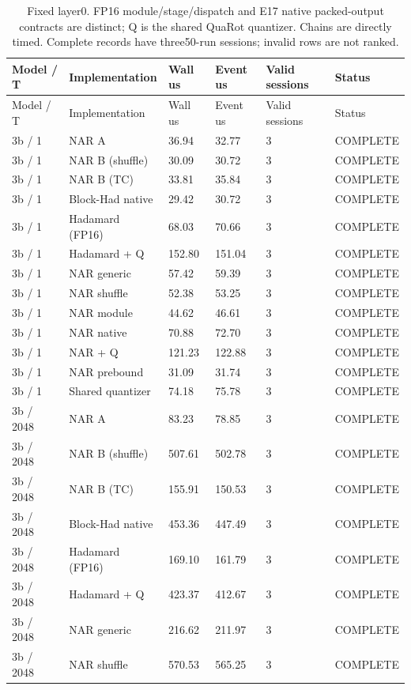 {\small
\begin{longtable}{llllll}
\caption{Fixed layer0. FP16 module/stage/dispatch and E17 native packed-output contracts are distinct; Q is the shared QuaRot quantizer. Chains are directly timed. Complete records have three50-run sessions; invalid rows are not ranked.} \\
\toprule
Model / T & Implementation & Wall us & Event us & Valid sessions & Status \\
\midrule
\endfirsthead
\toprule
Model / T & Implementation & Wall us & Event us & Valid sessions & Status \\
\midrule
\endhead
3b / 1 & NAR A & 36.94 & 32.77 & 3 & COMPLETE \\
3b / 1 & NAR B (shuffle) & 30.09 & 30.72 & 3 & COMPLETE \\
3b / 1 & NAR B (TC) & 33.81 & 35.84 & 3 & COMPLETE \\
3b / 1 & Block-Had native & 29.42 & 30.72 & 3 & COMPLETE \\
3b / 1 & Hadamard (FP16) & 68.03 & 70.66 & 3 & COMPLETE \\
3b / 1 & Hadamard + Q & 152.80 & 151.04 & 3 & COMPLETE \\
3b / 1 & NAR generic & 57.42 & 59.39 & 3 & COMPLETE \\
3b / 1 & NAR shuffle & 52.38 & 53.25 & 3 & COMPLETE \\
3b / 1 & NAR module & 44.62 & 46.61 & 3 & COMPLETE \\
3b / 1 & NAR native & 70.88 & 72.70 & 3 & COMPLETE \\
3b / 1 & NAR + Q & 121.23 & 122.88 & 3 & COMPLETE \\
3b / 1 & NAR prebound & 31.09 & 31.74 & 3 & COMPLETE \\
3b / 1 & Shared quantizer & 74.18 & 75.78 & 3 & COMPLETE \\
3b / 2048 & NAR A & 83.23 & 78.85 & 3 & COMPLETE \\
3b / 2048 & NAR B (shuffle) & 507.61 & 502.78 & 3 & COMPLETE \\
3b / 2048 & NAR B (TC) & 155.91 & 150.53 & 3 & COMPLETE \\
3b / 2048 & Block-Had native & 453.36 & 447.49 & 3 & COMPLETE \\
3b / 2048 & Hadamard (FP16) & 169.10 & 161.79 & 3 & COMPLETE \\
3b / 2048 & Hadamard + Q & 423.37 & 412.67 & 3 & COMPLETE \\
3b / 2048 & NAR generic & 216.62 & 211.97 & 3 & COMPLETE \\
3b / 2048 & NAR shuffle & 570.53 & 565.25 & 3 & COMPLETE \\

\end{longtable}}

